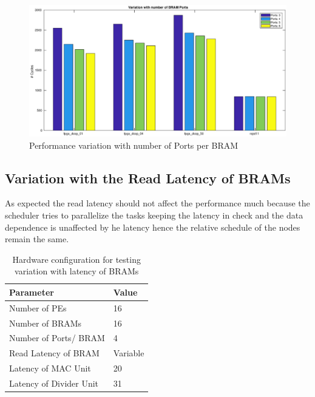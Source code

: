 \begin{figure}[H]
    \centering
    \includegraphics[width = \textwidth]{./Results/portVar.eps}
    \caption{Performance variation with number of Ports per BRAM}
    \label{fig:res:portVar:plot}
\end{figure}







\subsection{Variation with the Read Latency of BRAMs}

As expected the read latency should not affect the performance much because 
the scheduler tries to parallelize the tasks keeping the latency in check and the 
data dependence is unaffected by he latency hence the relative schedule of the nodes
remain the same.

\begin{table}[H]
    \centering
    \caption{Hardware configuration for testing variation with latency of BRAMs}
    \label{tab:res:barmLatVar:hwConfig}
    \begin{tabular}{L{6cm} L{1.5cm}}
        \toprule
        Parameter & Value \\
        \midrule
        Number of PEs           & 16  \\
        Number of BRAMs         & 16         \\
        Number of Ports/ BRAM   & 4         \\
        Read Latency of BRAM    & Variable          \\
        Latency of MAC Unit     & 20          \\
        Latency of Divider Unit & 31          \\
        \bottomrule
    \end{tabular}
\end{table}

